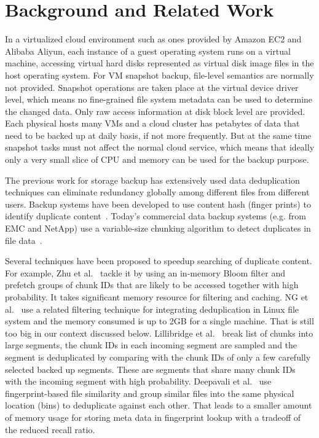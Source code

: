 
\section{Background and Related Work}
\label{sect:background}




In a virtualized cloud environment such as ones provided by Amazon EC2\cite{AmazonEC2} and Alibaba Aliyun\cite{Aliyun}, each instance of a guest operating system runs on a virtual machine, accessing virtual hard disks represented as virtual disk image files in the host operating system.
For VM snapshot backup, file-level semantics are normally not provided.
Snapshot operations are taken place at the virtual device driver level, which means no fine-grained file system metadata can be used to determine the changed data. Only raw access information at disk block level are provided. 
Each physical hosts many VMs and a cloud cluster has  petabytes of data that need to be backed up at daily basis, 
if not more frequently. But at the same time snapshot tasks must not affect the normal cloud service, 
which means that ideally only a very small slice of CPU and memory can be used for the backup purpose.


The previous work for storage backup has extensively used  data deduplication techniques can eliminate redundancy globally among different files from different users.
Backup systems have been developed to use content hash (finger prints) to identify duplicate
content~\cite{venti02,Rhea2008}.
Today's commercial data backup systems (e.g. from EMC and NetApp)
use a variable-size chunking algorithm to detect duplicates in file data~\cite{similar94,hydrastor09}.


Several techniques have been proposed to speedup searching of duplicate
content. For example,
Zhu et al.~\cite{bottleneck08} tackle it
by using an in-memory Bloom filter and prefetch groups of chunk IDs that are likely to be
accessed together with high probability. It takes significant memory resource for filtering and caching.
NG et al.~\cite{ NGmiddleware2011}  use
a related filtering technique for integrating deduplication in Linux  file system and the memory
consumed is up to 2GB for a single machine. That is still too big in our context discussed below.
Lillibridge et al.~\cite{sparseindex09} break list of chunks
into large segments, the chunk IDs in each incoming segment are sampled and the segment is
deduplicated by comparing with the chunk IDs of only a few carefully selected backed up segments.
These are segments that share many chunk IDs with the incoming segment with high probability.
Deepavali et al.~\cite{extreme_binning09}  use fingerprint-based file similarity  and group similar files into the same physical location (bins) to deduplicate against each other.
That leads  to a smaller amount of memory usage for storing meta data in fingerprint
lookup with a tradeoff of the reduced recall ratio.

